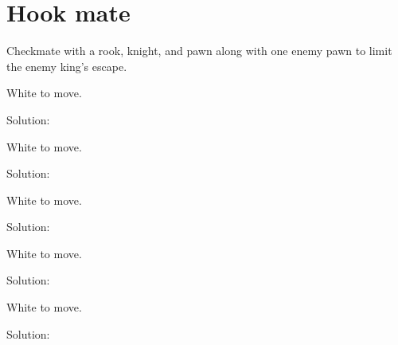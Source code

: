 \documentclass{book}
\begin{document}
\section{Hook mate}
Checkmate with a rook, knight, and pawn along with one enemy pawn to limit the enemy king's escape.\begin{multicols}{2} 
\begin{samepage} 
\newgame 


 
\showboard
 
 White to move. 
 
Solution: 
 
\end{samepage}\begin{samepage} 
\newgame 


 
\showboard
 
 White to move. 
 
Solution: 
 
\end{samepage}\begin{samepage} 
\newgame 


 
\showboard
 
 White to move. 
 
Solution: 
 
\end{samepage}\begin{samepage} 
\newgame 


 
\showboard
 
 White to move. 
 
Solution: 
 
\end{samepage}\begin{samepage} 
\newgame 


 
\showboard
 
 White to move. 
 
Solution: 
 
\end{samepage}\end{multicols} 
\newpage 
\end{document}
